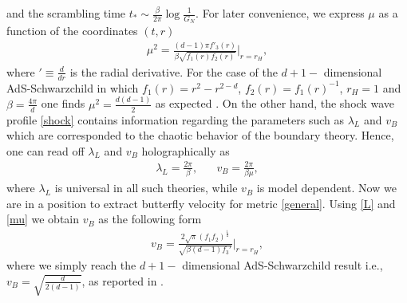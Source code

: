 \documentclass[preprintnumbers,aps,prd,longbibliography,nofootinbib,nobibnotes,amsmath,amssymb]{revtex4}
\begin{document}
and the scrambling time $t_{\ast} \sim \frac{\beta}{2\pi} \log \frac{1}{G_{N}}$. For later convenience, we express $\mu$ as a function of  the coordinates $ (t, r)$ 
\begin{align}\label{mu}
\mu ^2=\frac{(d-1)\pi f'_3(r)}{\beta \sqrt{f_1(r) f_2(r)}}\bigg\vert_{r=r_H},
\end{align}
where  $' \equiv \frac{d}{dr}$ is the radial derivative. For the case of the $d+1-$ dimensional AdS-Schwarzchild  in which $f_1(r)=r^2-r^{2-d}$, $f_2(r)=f_1(r)^{-1}$, $r_H=1$ and $\beta=\frac{4\pi}{d}$ one finds $\mu ^2=\frac{d(d-1)}{2}$ as expected \cite{Roberts:2014isa}. On the other hand, the  shock wave profile \eqref{shock} contains information regarding the parameters such as  $\lambda_{L}$ and   $v_B$ which are corresponded to  the chaotic behavior of the boundary theory. Hence, one can  read off  $\lambda_{L}$ and $v_B$ holographically as
\begin{align}\label{L}
\lambda_{L}=\frac{2\pi}{\beta},\,\,\,\,\,\,\,\,\,\,v_B=\frac{2\pi}{\beta \mu},
\end{align}
where  $\lambda_{L}$ is universal in all such theories, while $v_B$ is model dependent. Now we are in a position to extract butterfly velocity for metric \eqref{general}. Using \eqref{L} and \eqref{mu} we obtain $v_B$  as the following form
\begin{align}\label{bv}
v_B=\frac{2\sqrt{\pi}(f_1f_2)^{\frac{1}{4}}}{\sqrt{\beta (d-1)f_3'}}\bigg\vert_{r=r_H},
\end{align}
 where we simply reach the $d+1-$ dimensional AdS-Schwarzchild  result i.e., $v_B=\sqrt{\frac{d}{2(d-1)}}$, as reported in \cite{Roberts:2014isa}.
\end{document}
